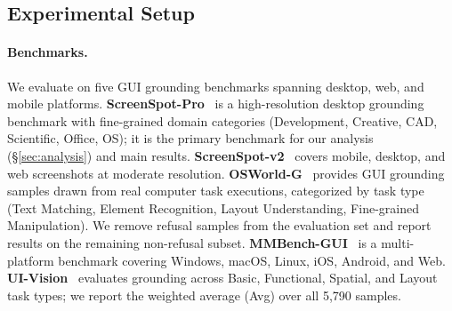 \subsection{Experimental Setup}
\label{sec:experiments:setup}

\paragraph{Benchmarks.}
We evaluate on five GUI grounding benchmarks spanning desktop, web, and mobile platforms.
\textbf{ScreenSpot-Pro}~\citep{screenspotpro} is a high-resolution desktop grounding benchmark with fine-grained domain categories (Development, Creative, CAD, Scientific, Office, OS); it is the primary benchmark for our analysis (\S\ref{sec:analysis}) and main results.
\textbf{ScreenSpot-v2}~\citep{Os-atlas} covers mobile, desktop, and web screenshots at moderate resolution.
\textbf{OSWorld-G}~\citep{xie2025scaling} provides GUI grounding samples drawn from real computer task executions, categorized by task type (Text Matching, Element Recognition, Layout Understanding, Fine-grained Manipulation). We remove refusal samples from the evaluation set and report results on the remaining non-refusal subset.
\textbf{MMBench-GUI}~\citep{mmbench} is a multi-platform benchmark covering Windows, macOS, Linux, iOS, Android, and Web.
\textbf{UI-Vision}~\citep{ui-vision} evaluates grounding across Basic, Functional, Spatial, and Layout task types; we report the weighted average (Avg) over all 5{,}790 samples.



